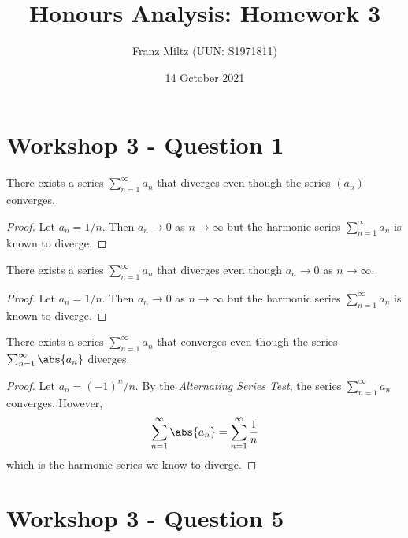 \documentclass{article}
\begin{document}
\title{Honours Analysis: Homework 3}
\author{Franz Miltz (UUN: S1971811)}
\date{14 October 2021}
\maketitle

\section{Workshop 3 - Question 1}

\begin{claim}
	There exists a series $\sum_{n=1}^\infty a_n$ that diverges even though the
	series $(a_n)$ converges.
\end{claim}
\begin{proof}
	Let $a_n=1/n$. Then $a_n\to 0$ as $n\to\infty$ but the harmonic series
	$\sum_{n=1}^\infty a_n$ is known to diverge.
\end{proof}

\begin{claim}
	There exists a series $\sum_{n=1}^\infty a_n$ that diverges even though
	$a_n\to 0$ as $n\to\infty$.
\end{claim}
\begin{proof}
	Let $a_n=1/n$. Then $a_n\to 0$ as $n\to\infty$ but the harmonic series
	$\sum_{n=1}^\infty a_n$ is known to diverge.
\end{proof}

\begin{claim}
	There exists a series $\sum_{n=1}^\infty a_n$ that converges even though
	the series $\sum_{n=1}^\infty \abs{a_n}$ diverges.
\end{claim}
\begin{proof}
	Let $a_n=(-1)^n/n$. By the \emph{Alternating Series Test}, the series $\sum_{n=1}^\infty a_n$
	converges. However,
	\begin{align}
		\sum_{n=1}^\infty \abs{a_n} = \sum_{n=1}^\infty \frac{1}{n}
	\end{align}
	which is the harmonic series we know to diverge.
\end{proof}

\section{Workshop 3 - Question 5}
\end{document}
